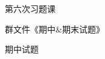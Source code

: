 \documentclass{article}
\begin{document}
 \renewcommand{\thenum}{\arabic{num}.} \newcommand{\num}{\refstepcounter{num}\text{\thenum}}

\newenvironment{jie}{\kaishu\zihao{-5}\color{blue}{\noindent\em 解：}\par}{\hfill $\diamondsuit$\par}

\newenvironment{zhengming}{\kaishu\zihao{-5}\color{blue}{\noindent\em 证明：}\par}{\hfill $\diamondsuit$\par}

\hphantom{~~}\hfill {\heiti 第六次习题课} \hfill\hphantom{~~}

\hphantom{~~}\hfill {\heiti 群文件《期中$\&$期末试题》} \hfill\hphantom{~~}

{\heiti {} 期中试题}
\end{document}
